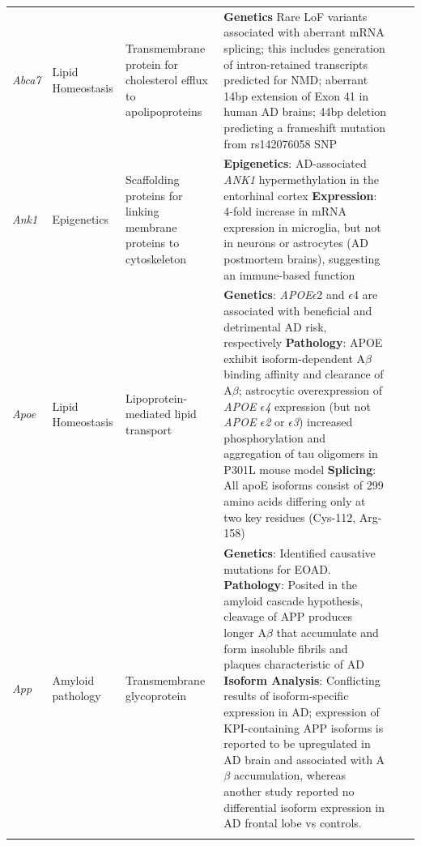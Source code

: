 \begin{changemargin}{1.5cm}
\begin{landscape}
\begin{longtable}[c]{p{1cm}p{2cm}p{4cm}p{16cm}p{1cm}p{1cm}}
			\centering \textit{Abca7} &
			\centering Lipid Homeostasis  &
			\centering Transmembrane protein for cholesterol efflux to apolipoproteins  &
			\tabitem \textbf{Genetics} Rare LoF variants associated with aberrant mRNA splicing; this includes generation of intron-retained transcripts predicted for NMD\cite{Steinberg2015,Cuyvers2015,Guennec2016};  aberrant 14bp extension of Exon 41 in human AD brains\cite{Steinberg2015,Grear2009}; 44bp deletion predicting a frameshift mutation from rs142076058 SNP \cite{Cukier2016} \\
			\hdashline[0.5pt/5pt]
			
			\centering \textit{Ank1} &
			\centering Epigenetics  &
			\centering Scaffolding proteins for linking membrane proteins to cytoskeleton &
			\tabitem \textbf{Epigenetics}: AD-associated \textit{ANK1} hypermethylation in the entorhinal cortex \cite{Smith2019, Lunnon2014} \newline 
			\tabitem \textbf{Expression}: 4-fold increase in mRNA expression in microglia, but not in neurons or astrocytes (AD postmortem brains), suggesting an immune-based function \cite{Mastroeni2017}  \\
			\hdashline[0.5pt/5pt]
			
			\centering \textit{Apoe} &
			\centering Lipid Homeostasis  &
			\centering Lipoprotein-mediated lipid transport  &
			\tabitem \textbf{Genetics}: \textit{APOE}$\epsilon$2 and $\epsilon$4 are associated with beneficial and detrimental AD risk, respectively \newline
			\tabitem \textbf{Pathology}: APOE exhibit isoform-dependent A$\beta$ binding affinity and clearance of A$\beta$; astrocytic overexpression of \textit{APOE $\epsilon$4} expression (but not \textit{APOE $\epsilon$2} or \textit{$\epsilon$3}) increased phosphorylation and aggregation of tau oligomers in P301L mouse model\cite{Jablonski2021} \newline
			\tabitem \textbf{Splicing}: All apoE isoforms consist of 299 amino acids differing only at two key residues (Cys-112, Arg-158) \\
			\hdashline[0.5pt/5pt]
			
			\centering \textit{App} &
			\centering Amyloid pathology  &
			\centering Transmembrane glycoprotein  &
			\tabitem \textbf{Genetics}: Identified causative mutations for EOAD. \newline
			\tabitem \textbf{Pathology}: Posited in the amyloid cascade hypothesis, cleavage of APP produces longer A$\beta$ that accumulate and form insoluble fibrils and plaques characteristic of AD \newline
			\tabitem \textbf{Isoform Analysis}: Conflicting results of isoform-specific expression in AD; expression of KPI-containing APP isoforms is reported to be upregulated in AD brain and associated with A$\beta$ accumulation\cite{Zhang2011}, whereas another study reported no differential isoform expression in AD frontal lobe vs controls\cite{Panegyres2000}. \\
			\hdashline[0.5pt/5pt]
			

\end{longtable}
\end{landscape}
\end{changemargin}
